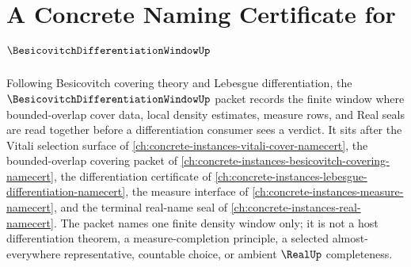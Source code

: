 \chapter{A Concrete Naming Certificate for $\BesicovitchDifferentiationWindowUp$}
\label{ch:concrete-instances-besicovitch-differentiation-window-namecert}

Following Besicovitch covering theory and Lebesgue differentiation, the $\BesicovitchDifferentiationWindowUp$ packet records the finite window where bounded-overlap cover data, local density estimates, measure rows, and Real seals are read together before a differentiation consumer sees a verdict. It sits after the Vitali selection surface of \autoref{ch:concrete-instances-vitali-cover-namecert}, the bounded-overlap covering packet of \autoref{ch:concrete-instances-besicovitch-covering-namecert}, the differentiation certificate of \autoref{ch:concrete-instances-lebesgue-differentiation-namecert}, the measure interface of \autoref{ch:concrete-instances-measure-namecert}, and the terminal real-name seal of \autoref{ch:concrete-instances-real-namecert}. The packet names one finite density window only; it is not a host differentiation theorem, a measure-completion principle, a selected almost-everywhere representative, countable choice, or ambient $\RealUp$ completeness.


